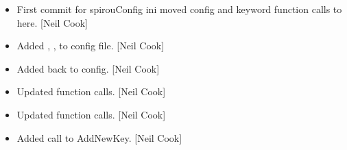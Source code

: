 \documentclass[a4paper,10pt,english]{report}
\begin{document}
\begin{itemize}
\item {} 
First commit for spirouConfig ini \sphinxhyphen{} moved config and keyword function
calls to here. {[}Neil Cook{]}

\item {} 
Added , ,  to config file. {[}Neil
Cook{]}

\item {} 
Added  back to config. {[}Neil Cook{]}

\item {} 
Updated function calls. {[}Neil Cook{]}

\item {} 
Updated function calls. {[}Neil Cook{]}

\item {} 
Added call to AddNewKey. {[}Neil Cook{]}

\end{itemize}
\end{document}
